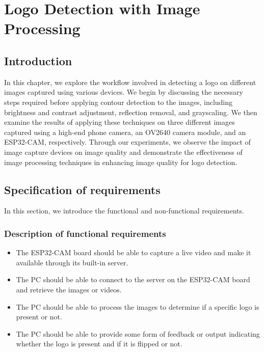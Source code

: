%
%



\chapter{Logo Detection with Image Processing}

\section{Introduction}
In this chapter, we explore the workflow involved in detecting a logo on different images captured using various devices. We begin by discussing the necessary steps required before applying contour detection to the images, including brightness and contrast adjustment, reflection removal, and grayscaling. We then examine the results of applying these techniques on three different images captured using a high-end phone camera, an OV2640 camera module, and an ESP32-CAM, respectively. Through our experiments, we observe the impact of image capture devices on image quality and demonstrate the effectiveness of image processing techniques in enhancing image quality for logo detection.
\section{Specification of requirements}
In this section, we introduce the functional and non-functional requirements.
\subsection{Description of functional requirements}
\begin{itemize}
\item The ESP32-CAM board should be able to capture a live  video and make it available through its built-in server.
\item The PC should be able to connect to the server on the ESP32-CAM board and retrieve the images or videos.
\item The PC should be able to process the images to determine if a specific logo is present or not.
\item The PC should be able to provide some form of feedback or output indicating whether the logo is present and if it is flipped or not.
\end{itemize}
